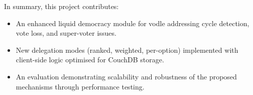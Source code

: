 In summary, this project contributes:
\begin{itemize}
    \item An enhanced liquid democracy module for vodle addressing cycle detection, vote loss, and super-voter issues.
    \item New delegation modes (ranked, weighted, per-option) implemented with client-side logic optimised for CouchDB storage.
    \item An evaluation demonstrating scalability and robustness of the proposed mechanisms through performance testing.
\end{itemize}
